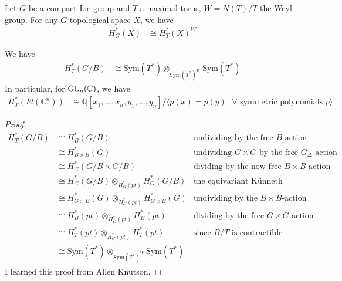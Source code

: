 \documentclass[12pt]{article}
\begin{document}
\begin{theorem}
    Let $G$ be a compact Lie group and $T$ a maximal torus, $W = N(T)/T$ the Weyl group. For any $G$-topological space $X$, we have
    \begin{align*}
        H^*_G(X) & \cong H^*_T(X)^W
    \end{align*}
\end{theorem}

\begin{theorem}
    We have
    \begin{align*}
        H^*_T(G/B) & \cong \text{Sym}(T^*) \otimes_{\text{Sym}(T^*)^W} \text{Sym}(T^*)
    \end{align*} In particular, for $\operatorname{GL}_n(\mathbb{C})$, we have
    \begin{align*}
        H^*_T(Fl(\mathbb{C}^n)) & \cong \mathbb{Q}[x_1,\ldots,x_n,y_1,\ldots,y_n] \Big/ \langle p(x) = p(y) \text{ $\forall$ symmetric polynomials $p$}\rangle
    \end{align*}
\end{theorem}
\begin{proof}
    \begin{align*}
        H^*_T(G/B) & \cong H^*_B(G/B)                                                  & \text{undividing by the free $B$-action}                     \\
                   & \cong H^*_{B \times B}(G)                                         & \text{undividing $G \times G$ by the free $G_\Delta$-action} \\
                   & \cong H^*_G(G/B \times G/B)                                       & \text{dividing by the now-free $B \times B$-action}          \\
                   & \cong H^*_G(G/B) \otimes_{H^*_G(pt)} H^*_G(G/B)                   & \text{the equivariant Künneth theorem}                       \\
                   & \cong H^*_{G \times B}(G) \otimes_{H^*_G(pt)} H^*_{G \times B}(G) & \text{undividing by the $B \times B$-action}                 \\
                   & \cong H^*_B(pt) \otimes_{H^*_G(pt)} H^*_B(pt)                     & \text{dividing by the free $G \times G$-action}              \\
                   & \cong H^*_T(pt) \otimes_{H^*_G(pt)} H^*_T(pt)                     & \text{since $B/T$ is contractible}                           \\
                   & \cong \text{Sym}(T^*) \otimes_{\text{Sym}(T^*)^W} \text{Sym}(T^*)
    \end{align*}
I learned this proof from Allen Knutson.
\end{proof}
\end{document}
